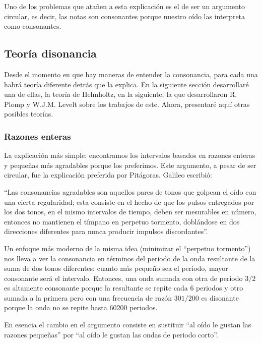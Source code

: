 \documentclass[11pt,a4paper]{article}
\begin{document}
	
	Uno de los problemas que atañen a esta explicación es el de ser un argumento circular, es decir, las notas son consonantes porque nuestro oído las interpreta como consonantes.
	
	
	\subsection{Teoría disonancia}
	
	Desde el momento en que hay maneras de entender la consonancia, para cada una habrá teoría diferente detrás que la explica. En la siguiente sección desarrollaré una de ellas, la teoría de Helmholtz, en la siguiente, la que desarrollaron R. Plomp y W.J.M. Levelt sobre los trabajos de este. Ahora, presentaré aquí otras posibles teorías.
	
	\subsubsection{Razones enteras}
		
	La explicación más simple: encontramos los intervalos basados en razones enteras y pequeñas más agradables porque los preferimos. Este argumento, a pesar de ser circular, fue la explicación preferida por Pitágoras. Galileo escribió:
	
	\begin{center}
	    ``Las consonancias agradables son aquellos pares de tonos que golpean el oído con una cierta regularidad; esta consiste en el hecho de que los pulsos entregados por los dos tonos, en el mismo intervalos de tiempo, deben ser mesurables en número, entonces no mantienen el tímpano en perpetuo tormento, doblándose en dos direcciones diferentes para nunca producir impulsos discordantes''. %
	\end{center}
	
	Un enfoque más moderno de la misma idea (minimizar el ``perpetuo tormento'') nos lleva a ver la consonancia en términos del periodo de la onda resultante de la suma de dos tonos diferentes: cuanto más pequeño sea el periodo, mayor consonante será el intervalo. Entonces, una onda sumada con otra de periodo $3/2$ es altamente consonante porque la resultante se repite cada $6$ periodos y otro sumada a la primera pero con una frecuencia de razón $301/200$ es disonante porque la onda no se repite hasta $60200$ periodos.
	
	En esencia el cambio en el argumento consiste en sustituir ``al oído le gustan las razones pequeñas'' por ``al oído le gustan las ondas de periodo corto''.	
	
\end{document}
